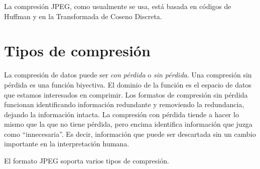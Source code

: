 La compresión JPEG, como usualmente se usa, está basada en códigos de Huffman y en
la Transformada de Coseno Discreta.

\section{Tipos de compresión}

La compresión de datos puede ser \emph{con pérdida} o \emph{sin pérdida}. Una
\gls{compresión sin pérdida} es una función biyectiva. El dominio de la función
es el espacio de datos que estamos interesados en comprimir. Los formatos de
compresión sin pérdida funcionan identificando información redundante y
removiendo la redundancia, dejando la información intacta. La compresión con
pérdida tiende a hacer lo mismo que la que no tiene pérdida, pero encima
identifica información que juzga como ``innecesaria''. Es decir, información
que puede ser descartada sin un cambio importante en la interpretación humana.

El formato JPEG soporta varios tipos de compresión.

